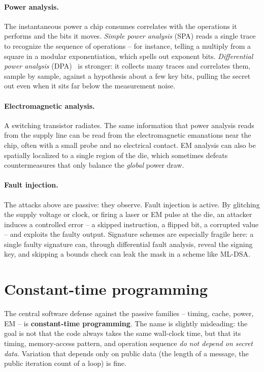 \paragraph{Power analysis.}
The instantaneous power a chip consumes correlates with the operations it performs
and the bits it moves. \emph{Simple power analysis} (SPA) reads a single trace to
recognize the sequence of operations -- for instance, telling a multiply from a
square in a modular exponentiation, which spells out exponent bits. \emph{Differential
power analysis} (DPA)~\cite{kjj1999} is stronger: it collects many traces and correlates them,
sample by sample, against a hypothesis about a few key bits, pulling the secret out
even when it sits far below the measurement noise.

\paragraph{Electromagnetic analysis.}
A switching transistor radiates. The same information that power analysis reads from
the supply line can be read from the electromagnetic emanations near the chip, often
with a small probe and no electrical contact. EM analysis can also be spatially
localized to a single region of the die, which sometimes defeats countermeasures that
only balance the \emph{global} power draw.

\paragraph{Fault injection.}
The attacks above are passive: they observe. Fault injection is active. By glitching
the supply voltage or clock, or firing a laser or EM pulse at the die, an attacker
induces a controlled error -- a skipped instruction, a flipped bit, a corrupted
value -- and exploits the faulty output. Signature schemes are especially fragile
here: a single faulty signature can, through differential fault analysis, reveal the
signing key, and skipping a bounds check can leak the mask in a scheme like ML-DSA.

\section{Constant-time programming}

The central software defense against the passive families -- timing, cache, power,
EM -- is \textbf{constant-time programming}. The name is slightly misleading: the
goal is not that the code always takes the same wall-clock time, but that its timing,
memory-access pattern, and operation sequence \emph{do not depend on secret data}.
Variation that depends only on public data (the length of a message, the public
iteration count of a loop) is fine.

